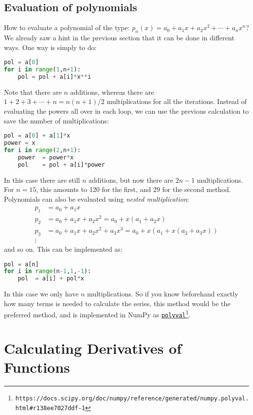 \documentclass[graybox,sectrefs,envcountresetchap,open=right,final]{svmonodo}
\begin{document}
\subsection{Evaluation of polynomials}
How to evaluate a polynomial of the type: $p_n(x)=a_0+a_1x+a_2x^2+\cdots+a_nx^n$? We already saw a hint in the previous section that it can be done in different ways. One way is simply to 
do:
\begin{lstlisting}[language=Python,style=blue1]
pol = a[0]
for i in range(1,n+1):
	pol = pol + a[i]*x**i
\end{lstlisting}
Note that there are $n$ additions, whereas there are $1 + 2 +3+\cdots+n=n(n+1)/2$ multiplications for all the iterations. Instead of evaluating the powers all over in 
each loop, we can use the previous calculation to save the number of multiplications:
\begin{lstlisting}[language=Python,style=blue1]
pol = a[0] + a[1]*x
power = x
for i in range(2,n+1):
	power  = power*x
	pol    = pol + a[i]*power
\end{lstlisting}
In this case there are still $n$ additions, but now there are $2n-1$ multiplications. For $n=15$, this amounts to 120 for the first, and 29 for the second method. 
Polynomials can also be evaluated using \emph{nested multiplication}:
\begin{align}
p_1 & = a_0+a_1x\nonumber\\ 
p_2 & = a_0+a_1x+a_2x^2=a_0+x(a_1+a_2x)\nonumber\\ 
p_3 & = a_0+a_1x+a_2x^2+a_3x^3=a_0+x(a_1+x(a_2+a_3x))\nonumber\\ 
\vdots
\end{align}   
and so on. This can be implemented as:
\begin{lstlisting}[language=Python,style=blue1]
pol = a[n]
for i in range(n-1,1,-1):
	pol  = a[i] + pol*x
\end{lstlisting}
In this case we only have $n$ multiplications. So if you know beforehand exactly how many terms is needed to calculate the series, this method would be the preferred method, and is implemented in NumPy as \href{{https://docs.scipy.org/doc/numpy/reference/generated/numpy.polyval.html#r138ee7027ddf-1}}{\nolinkurl{polyval}\footnote{\texttt{https://docs.scipy.org/doc/numpy/reference/generated/numpy.polyval.html\#r138ee7027ddf-1}}}. 

\section{Calculating Derivatives of Functions}
\label{ch:taylor:der}
\end{document}
